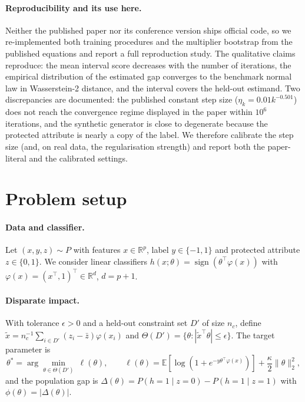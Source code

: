 \documentclass[10pt,twocolumn]{article}
\newcommand{\E}{\mathbb{E}}
\newcommand{\R}{\mathbb{R}}
\newcommand{\Dp}{D'}
\begin{document}
\paragraph{Reproducibility and its use here.} Neither the published paper nor its conference version \citep{roy2023uq} ships official code, so we
re-implemented both training procedures and the multiplier bootstrap from the published equations and
report a full reproduction study.  The qualitative claims reproduce: the mean interval score
decreases with the number of iterations, the empirical distribution of the estimated gap converges to
the benchmark normal law in Wasserstein-2 distance, and the interval covers the held-out estimand.
Two discrepancies are documented: the published constant step size ($\eta_k=0.01k^{-0.501}$) does not
reach the convergence regime displayed in the paper within $10^6$ iterations, and the synthetic
generator is close to degenerate because the protected attribute is nearly a copy of the label.  We
therefore calibrate the step size (and, on real data, the regularisation strength) and report both
the paper-literal and the calibrated settings.

\section{Problem setup}
\label{sec:setup}

\paragraph{Data and classifier.} Let $(x,y,z)\sim P$ with features $x\in\R^p$, label
$y\in\{-1,1\}$ and protected attribute $z\in\{0,1\}$.  We consider linear classifiers
$h(x;\theta)=\operatorname{sign}(\theta^\top\varphi(x))$ with $\varphi(x)=(x^\top,1)^\top
\in\R^d$, $d=p+1$.

\paragraph{Disparate impact.} With tolerance $\epsilon>0$ and a held-out constraint set
$\Dp$ of size $n_c$, define
$\tilde x=n_c^{-1}\sum_{i\in\Dp}(z_i-\bar z)\varphi(x_i)$ and
$\Theta(\Dp)=\{\theta:|\tilde x^\top\theta|\le\epsilon\}$.  The target parameter is
\begin{equation}\label{eq:theta}
\theta^*=\arg\min_{\theta\in\Theta(\Dp)}\ \ell(\theta),\qquad
\ell(\theta)=\E[\log(1+e^{-y\theta^\top\varphi(x)})]+\frac{\kappa}{2}\|\theta\|_2^2 ,
\end{equation}
and the population gap is $\Delta(\theta)=P(h=1\mid z=0)-P(h=1\mid z=1)$ with
$\phi(\theta)=|\Delta(\theta)|$.
\end{document}
